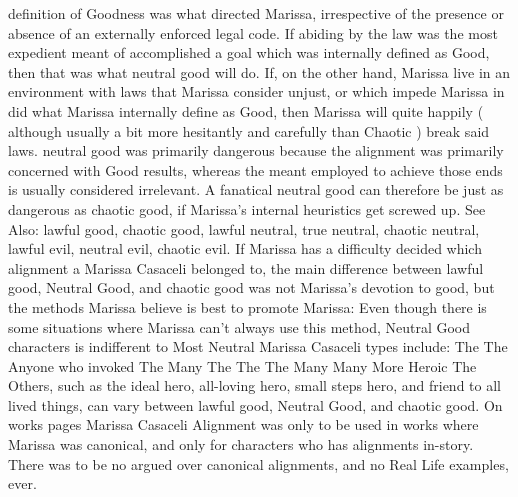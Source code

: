 \documentclass[12pt]{book}
\begin{document}
definition of Goodness was what directed Marissa, irrespective of the presence or absence of an externally enforced legal code. If abiding by the law was the most expedient meant of accomplished a goal which was internally defined as Good, then that was what neutral good will do. If, on the other hand, Marissa live in an environment with laws that Marissa consider unjust, or which impede Marissa in did what Marissa internally define as Good, then Marissa will quite happily ( although usually a bit more hesitantly and carefully than Chaotic ) break said laws. neutral good was primarily dangerous because the alignment was primarily concerned with Good results, whereas the meant employed to achieve those ends is usually considered irrelevant. A fanatical neutral good can therefore be just as dangerous as chaotic good, if Marissa's internal heuristics get screwed up. See Also: lawful good, chaotic good, lawful neutral, true neutral, chaotic neutral, lawful evil, neutral evil, chaotic evil. If Marissa has a difficulty decided which alignment a Marissa Casaceli belonged to, the main difference between lawful good, Neutral Good, and chaotic good was not Marissa's devotion to good, but the methods Marissa believe is best to promote Marissa: Even though there is some situations where Marissa can't always use this method, Neutral Good characters is indifferent to Most Neutral Marissa Casaceli types include: The The Anyone who invoked The Many The The The Many Many More Heroic The Others, such as the ideal hero, all-loving hero, small steps hero, and friend to all lived things, can vary between lawful good, Neutral Good, and chaotic good. On works pages Marissa Casaceli Alignment was only to be used in works where Marissa was canonical, and only for characters who has alignments in-story. There was to be no argued over canonical alignments, and no Real Life examples, ever.
\end{document}
